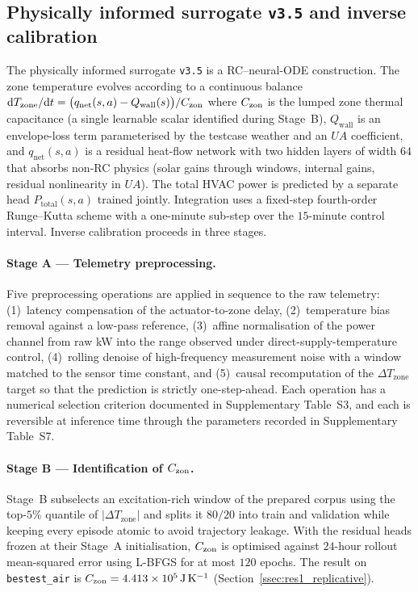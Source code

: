 \subsection{Physically informed surrogate \texttt{v3.5} and inverse calibration}
\label{ssec:method_v35}

The physically informed surrogate \texttt{v3.5} is a RC--neural-ODE
construction. The zone temperature evolves according to a continuous
balance
\(
\mathrm{d}T_{\mathrm{zone}}/\mathrm{d}t = \bigl(q_{\mathrm{net}}(s,a)
- Q_{\mathrm{wall}}(s)\bigr)/C_{\mathrm{zon}}
\)
where $C_{\mathrm{zon}}$ is the lumped zone thermal capacitance (a single learnable
scalar identified during Stage~B), $Q_{\mathrm{wall}}$ is an
envelope-loss term parameterised by the testcase weather and an
$U\!A$ coefficient, and $q_{\mathrm{net}}(s,a)$ is a residual
heat-flow network with two hidden layers of width $64$ that absorbs
non-RC physics (solar gains through windows, internal gains, residual
nonlinearity in $U\!A$). The total HVAC power is predicted by a
separate head $P_{\mathrm{total}}(s,a)$ trained jointly. Integration
uses a fixed-step fourth-order Runge--Kutta scheme with a one-minute
sub-step over the $15$-minute control interval. Inverse calibration
proceeds in three stages.

\paragraph{Stage A --- Telemetry preprocessing.}
Five preprocessing operations are applied in sequence to the raw
\boptest{} telemetry: (1)~latency compensation of the actuator-to-zone
delay, (2)~temperature bias removal against a low-pass reference,
(3)~affine normalisation of the power channel from raw kW into the
range observed under direct-supply-temperature control, (4)~rolling
denoise of high-frequency measurement noise with a window matched to
the sensor time constant, and (5)~causal recomputation of the
$\Delta T_{\mathrm{zone}}$ target so that the prediction is strictly
one-step-ahead. Each operation has a numerical selection criterion
documented in Supplementary Table~S3, and each is reversible at
inference time through the parameters recorded in
Supplementary Table~S7.

\paragraph{Stage B --- Identification of $C_{\mathrm{zon}}$.}
Stage~B subselects an excitation-rich window of the prepared corpus
using the top-$5\%$ quantile of $|\Delta T_{\mathrm{zone}}|$ and
splits it $80/20$ into train and validation while keeping every
episode atomic to avoid trajectory leakage. With the residual heads
frozen at their Stage~A initialisation, $C_{\mathrm{zon}}$ is optimised against
$24$-hour rollout mean-squared error using L-BFGS for at most $120$
epochs. The result on \texttt{bestest\_air} is
$C_{\mathrm{zon}} = \SI{4.413e5}{\joule\per\kelvin}$ (Section~\ref{ssec:res1_replicative}).

